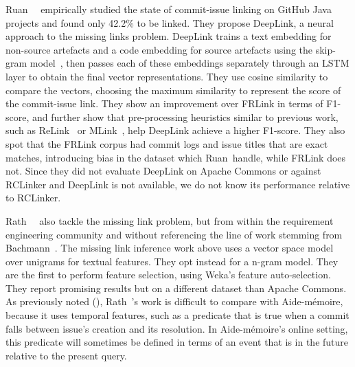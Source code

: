 Ruan~\etal~\cite{ruan2019deeplink} empirically studied the state of commit-issue
linking on GitHub Java projects and found only 42.2\% to be linked. They propose
DeepLink, a neural approach to the missing links problem. DeepLink trains a text
embedding for non-source artefacts and a code embedding for source artefacts
using the skip-gram model~\cite{mikolov2013efficient, mikolov2013distributed},
then passes each of these embeddings separately through an LSTM layer to obtain
the final vector representations. They use cosine similarity to compare the
vectors, choosing the maximum similarity to represent the score of the
commit-issue link. They show an improvement over FRLink in terms of F1-score,
and further show that pre-processing heuristics similar to previous work, such
as ReLink~\cite{relink} or MLink~\cite{MLink}, help DeepLink achieve a higher
F1-score. They also spot that the FRLink corpus had commit logs and issue titles
that are exact matches, introducing bias in the dataset which Ruan~\etal handle,
while FRLink does not. Since they did not evaluate DeepLink on Apache Commons or
against RCLinker and DeepLink is not available, we do not know its performance
relative to RCLinker.

Rath~\etal~\cite{1804.02433} also tackle the missing link problem, but from
within the requirement engineering community and without referencing the line of
work stemming from Bachmann~\etal. The missing link inference work above uses a
vector space model over unigrams for textual features. They opt instead for a
n-gram model. They are the first to perform feature selection, using Weka's
feature auto-selection. They report promising results but on a different dataset
than Apache Commons. As previously noted (),
Rath~\etal's work is difficult to compare with Aide-mémoire, because it uses
temporal features, such as a predicate that is true when a commit falls between
issue's creation and its resolution. In Aide-mémoire's online setting, this
predicate will sometimes be defined in terms of an event that is in the future
relative to the present query.


